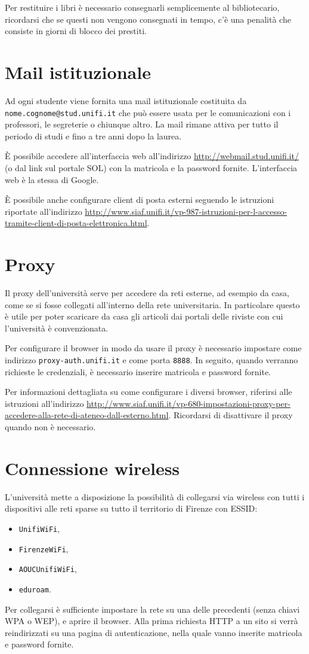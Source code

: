 \documentclass[11pt,a4paper]{article}
\begin{document}
Per restituire i libri è necessario consegnarli semplicemente al
bibliotecario, ricordarsi che se questi non vengono consegnati in
tempo, c'è una penalità che consiste in giorni di blocco dei
prestiti.

\section{Mail istituzionale}
Ad ogni studente viene fornita una mail istituzionale costituita da
\nolinkurl{nome.cognome@stud.unifi.it} che può essere usata per le
comunicazioni con i professori, le segreterie o chiunque altro. La
mail rimane attiva per tutto il periodo di studi e fino a tre anni
dopo la laurea.

È possibile accedere all'interfaccia web all'indirizzo
\url{http://webmail.stud.unifi.it/} (o dal link sul portale \ac{SOL})
con la matricola e la password fornite. L'interfaccia web è
la stessa di Google.

È possibile anche configurare client di posta esterni seguendo le
istruzioni riportate all'indirizzo
\url{http://www.siaf.unifi.it/vp-987-istruzioni-per-l-accesso-tramite-client-di-posta-elettronica.html}.

\section{Proxy}
Il proxy dell'università serve per accedere da reti esterne, ad
esempio da casa, come se si fosse collegati all'interno della rete
universitaria. In particolare questo è utile per poter scaricare da
casa gli articoli dai portali delle riviste con cui l'università è
convenzionata.

Per configurare il browser in modo da usare il proxy è necessario
impostare come indirizzo \nolinkurl{proxy-auth.unifi.it} e come porta
\nolinkurl{8888}. In seguito, quando verranno richieste le credenziali, è
necessario inserire matricola e password fornite.

Per informazioni dettagliata su come configurare i diversi browser,
riferirsi alle istruzioni all'indirizzo
\url{http://www.siaf.unifi.it/vp-680-impostazioni-proxy-per-accedere-alla-rete-di-ateneo-dall-esterno.html}. Ricordarsi
di disattivare il proxy quando non è necessario.

\section{Connessione wireless}
L'università mette a disposizione la possibilità di collegarsi via
wireless con tutti i dispositivi alle reti sparse su tutto il
territorio di Firenze con ESSID:
\begin{itemize}
\item \nolinkurl{UnifiWiFi},
\item \nolinkurl{FirenzeWiFi},
\item \nolinkurl{AOUCUnifiWiFi},
\item \nolinkurl{eduroam}.
\end{itemize}

Per collegarsi è sufficiente impostare la rete su una delle precedenti
(senza chiavi WPA o WEP), e aprire il browser. Alla prima richiesta
HTTP a un sito si verrà reindirizzati su una pagina di autenticazione,
nella quale vanno inserite matricola e password fornite.
\end{document}
